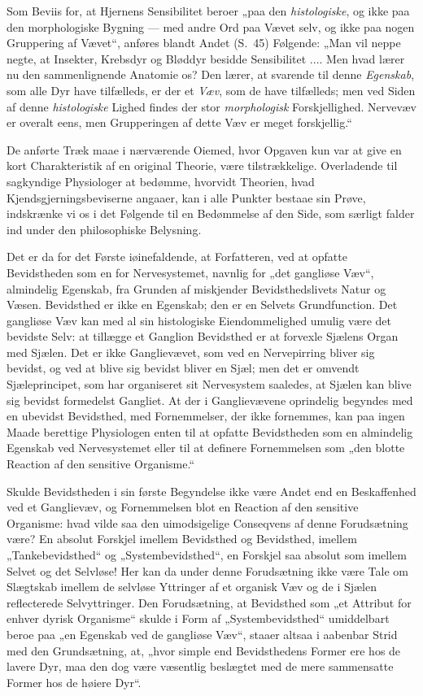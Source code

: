 \documentclass[11pt]{book}
\newcommand{\opage}[1]{\marginnote{\footnotesize\textit{[#1]}}}
\begin{document}
Som Beviis for, at Hjernens Sensibilitet beroer „paa den
\emph{histologiske}, og ikke paa den morphologiske Bygning --- med
andre Ord paa Vævet selv, og ikke paa nogen Gruppering af Vævet“,
anføres blandt Andet (S.~45) Følgende: „Man vil neppe negte, at
Insekter, Krebsdyr og Bløddyr besidde Sensibilitet .... Men hvad lærer
nu den sammenlignende Anatomie os? Den lærer, at svarende til denne
\emph{Egenskab}, som alle Dyr have tilfælleds, er der et \emph{Væv},
som de have tilfælleds; men ved Siden af denne \emph{histologiske}
Lighed findes der stor \emph{morphologisk} Forskjellighed. Nervevæv er
overalt eens, men Grupperingen af dette Væv er meget forskjellig.“

De anførte Træk maae i nærværende Oiemed, hvor Opgaven kun var at give
en kort Charakteristik af en original Theorie, være tilstrækkelige.
Overladende til sagkyndige Physiologer at bedømme, hvorvidt Theorien,
hvad Kjendsgjerningsbeviserne angaaer, kan i alle Punkter bestaae sin
Prøve, indskrænke vi os i det Følgende til en Bedømmelse af den Side,
som særligt falder ind under den philosophiske Belysning.

Det er da for det Første iøinefaldende, at Forfatteren, ved at opfatte
Bevidstheden som en for Nervesystemet, navnlig for „det gangliøse
Væv“, almindelig Egenskab, fra Grunden af miskjender Bevidsthedslivets
Natur og Væsen. Bevidsthed er ikke en Egenskab; den er en Selvets
Grundfunction. Det
\opage{369} \setcounter{footnote}{0}%
gangliøse Væv kan med al sin histologiske Eiendommelighed umulig være
det bevidste Selv: at tillægge et Ganglion Bevidsthed er at forvexle
Sjælens Organ med Sjælen. Det er ikke Ganglievævet, som ved en
Nervepirring bliver sig bevidst, og ved at blive sig bevidst bliver en
Sjæl; men det er omvendt Sjæleprincipet, som har organiseret sit
Nervesystem saaledes, at Sjælen kan blive sig bevidst formedelst
Gangliet. At der i Ganglievævene oprindelig begyndes med en ubevidst
Bevidsthed, med Fornemmelser, der ikke fornemmes, kan paa ingen Maade
berettige Physiologen enten til at opfatte Bevidstheden som en
almindelig Egenskab ved Nervesystemet eller til at definere
Fornemmelsen som „den blotte Reaction af den sensitive Organisme.“

Skulde Bevidstheden i sin første Begyndelse ikke være Andet end en
Beskaffenhed ved et Ganglievæv, og Fornemmelsen blot en Reaction af
den sensitive Organisme: hvad vilde saa den uimodsigelige Conseqvens
af denne Forudsætning være? En absolut Forskjel imellem Bevidsthed og
Bevidsthed, imellem „Tankebevidsthed“ og „Systembevidsthed“, en
Forskjel saa absolut som imellem Selvet og det Selvløse! Her kan da
under denne Forudsætning ikke være Tale om Slægtskab imellem de
selvløse Yttringer af et organisk Væv og de i Sjælen reflecterede
Selvyttringer. Den Forudsætning, at Bevidsthed som „et Attribut for
enhver dyrisk Organisme“ skulde i Form af „Systembevidsthed“
umiddelbart beroe paa „en Egenskab ved de gangliøse Væv“, staaer
altsaa i aabenbar Strid med den Grundsætning, at, „hvor simple end
Bevidsthedens Former ere hos de lavere Dyr, maa den dog være
væsentlig beslægtet med de mere sammensatte Former hos de høiere
Dyr“.
\end{document}
